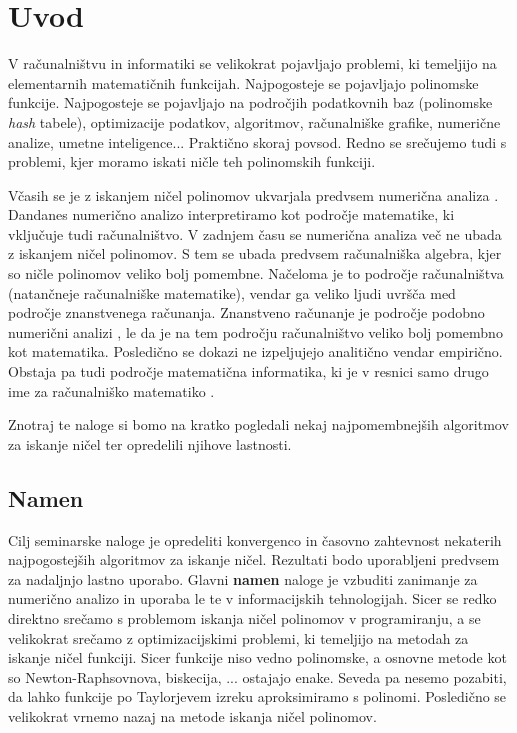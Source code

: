\chapter{Uvod}
V računalništvu in informatiki se velikokrat pojavljajo problemi, ki temeljijo na elementarnih matematičnih funkcijah. Najpogosteje se pojavljajo polinomske funkcije. Najpogosteje se pojavljajo na področjih podatkovnih baz (polinomske \textit{hash} tabele), optimizacije podatkov, algoritmov, računalniške grafike, numerične analize, umetne inteligence... Praktično skoraj povsod. Redno se srečujemo tudi s problemi, kjer moramo iskati ničle teh polinomskih funkciji. 

Včasih se je z iskanjem ničel polinomov ukvarjala predvsem numerična analiza \cite{Ridgway2011}. Dandanes numerično analizo interpretiramo kot področje matematike, ki vključuje tudi računalništvo. V zadnjem času se numerična analiza več ne ubada z iskanjem ničel polinomov. S tem se ubada predvsem računalniška algebra, kjer so ničle polinomov veliko bolj pomembne. Načeloma je to področje računalništva (natančneje računalniške matematike), vendar ga veliko ljudi uvršča med področje znanstvenega računanja. Znanstveno računanje je področje podobno numerični analizi \cite{1}, le da je na tem področju računalništvo veliko bolj pomembno kot matematika. Posledično se dokazi ne izpeljujejo analitično vendar empirično. Obstaja pa tudi področje matematična informatika, ki je v resnici samo drugo ime za računalniško matematiko \cite{RačInf}.

Znotraj te naloge si bomo na kratko pogledali nekaj najpomembnejših algoritmov za iskanje ničel ter opredelili njihove lastnosti.

\section{Namen}
Cilj seminarske naloge je opredeliti konvergenco in časovno zahtevnost nekaterih najpogostejših algoritmov za iskanje ničel. Rezultati bodo uporabljeni predvsem za nadaljnjo lastno uporabo. Glavni \textbf{namen} naloge je vzbuditi zanimanje za numerično analizo in uporaba le te v informacijskih tehnologijah. Sicer se redko direktno srečamo s problemom iskanja ničel polinomov v programiranju, a se velikokrat srečamo z optimizacijskimi problemi, ki temeljijo na metodah za iskanje ničel funkciji. Sicer funkcije niso vedno polinomske, a osnovne metode kot so Newton-Raphsovnova, biskecija, ... ostajajo enake. Seveda pa nesemo pozabiti, da lahko funkcije po Taylorjevem izreku aproksimiramo s polinomi. Posledično se velikokrat vrnemo nazaj na metode iskanja ničel polinomov.

